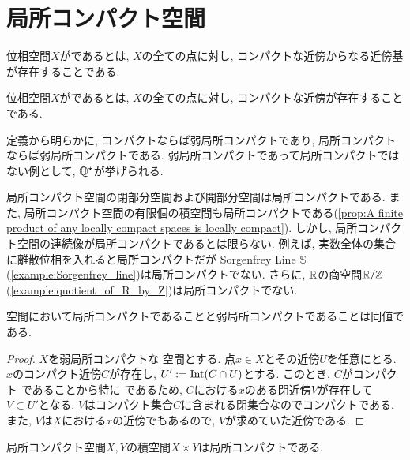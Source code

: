 \documentclass[uplatex, dvipdfmx, a4paper, 12pt, class=jsbook, crop=false]{standalone}
\begin{document}
\section{局所コンパクト空間}
\label{sec:locally-compact-spaces}

\newcommand{\bbS}{\mathbb{S}}

\begin{definition}
	位相空間$ X $がであるとは, $ X $の全ての点に対し, コンパクトな近傍からなる近傍基が存在することである.
\end{definition}

\begin{definition}
		位相空間$ X $がであるとは, $ X $の全ての点に対し, コンパクトな近傍が存在することである.
\end{definition}

定義から明らかに, コンパクトならば弱局所コンパクトであり, 局所コンパクトならば弱局所コンパクトである. 弱局所コンパクトであって局所コンパクトではない例として, $ \mathbb{Q}^\star $が挙げられる.

局所コンパクト空間の閉部分空間および開部分空間は局所コンパクトである. また, 局所コンパクト空間の有限個の積空間も局所コンパクトである(\ref{prop:A finite product of any locally compact spaces is locally compact}). しかし, 局所コンパクト空間の連続像が局所コンパクトであるとは限らない.
例えば, 実数全体の集合に離散位相を入れると局所コンパクトだが Sorgenfrey Line $ \bbS $ (\ref{example:Sorgenfrey_line})は局所コンパクトでない. さらに, $ \mathbb{R} $の商空間$ \mathbb{R} / \mathbb{Z} $(\ref{example:quotient_of_R_by_Z})は局所コンパクトでない.

\begin{proposition}
	\Hausdorff 空間において局所コンパクトであることと弱局所コンパクトであることは同値である.
\end{proposition}
\begin{proof}
	$ X $を弱局所コンパクトな \Hausdorff 空間とする. 点$ x \in X $とその近傍$ U $を任意にとる. $ x $のコンパクト近傍$ C $が存在し, $ U' \mathrel{:=} \mathop{\mathrm{Int}}\nolimits (C \cap U) $とする. このとき, $ C $がコンパクト \Hausdorff であることから特に  であるため, $ C $における$ x $のある閉近傍$ V $が存在して$ V \subset U' $となる. $ V $はコンパクト集合$ C $に含まれる閉集合なのでコンパクトである. また, $ V $は$ X $における$ x $の近傍でもあるので, $ V $が求めていた近傍である.
\end{proof}

\begin{proposition}
	\label{prop:A finite product of any locally compact spaces is locally compact}
	局所コンパクト空間$ X, Y $の積空間$ X \times Y $は局所コンパクトである.	
\end{proposition}
\end{document}
